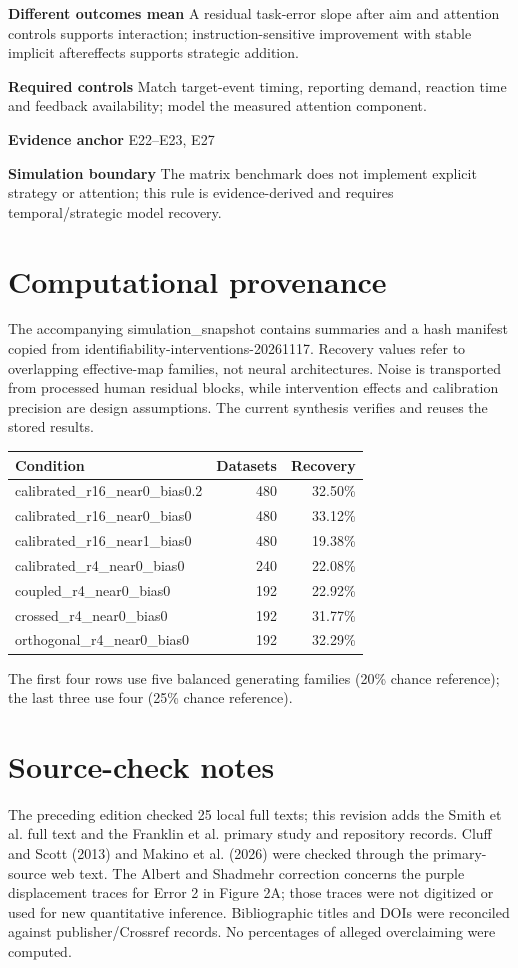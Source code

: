 \documentclass[11pt,a4paper]{article}
\begin{document}
\medskip\textbf{Different outcomes mean} A residual task-error slope after aim and attention controls supports interaction; instruction-sensitive improvement with stable implicit aftereffects supports strategic addition.\par
\medskip\textbf{Required controls} Match target-event timing, reporting demand, reaction time and feedback availability; model the measured attention component.\par
\medskip\textbf{Evidence anchor} E22--E23, E27\par
\medskip\textbf{Simulation boundary} The matrix benchmark does not implement explicit strategy or attention; this rule is evidence-derived and requires temporal/strategic model recovery.\par
\clearpage\section{Computational provenance}
The accompanying simulation\_snapshot contains summaries and a hash manifest copied from identifiability-interventions-20261117. Recovery values refer to overlapping effective-map families, not neural architectures. Noise is transported from processed human residual blocks, while intervention effects and calibration precision are design assumptions. The current synthesis verifies and reuses the stored results.
\begin{center}\small\begin{tabular}{lrr}\toprule
Condition & Datasets & Recovery\\\midrule
calibrated\_r16\_near0\_bias0.2 & 480 & 32.50\%\\
calibrated\_r16\_near0\_bias0 & 480 & 33.12\%\\
calibrated\_r16\_near1\_bias0 & 480 & 19.38\%\\
calibrated\_r4\_near0\_bias0 & 240 & 22.08\%\\
coupled\_r4\_near0\_bias0 & 192 & 22.92\%\\
crossed\_r4\_near0\_bias0 & 192 & 31.77\%\\
orthogonal\_r4\_near0\_bias0 & 192 & 32.29\%\\
\bottomrule\end{tabular}\end{center}
The first four rows use five balanced generating families (20\% chance reference); the last three use four (25\% chance reference).
\section{Source-check notes}
The preceding edition checked 25 local full texts; this revision adds the Smith et al. full text and the Franklin et al. primary study and repository records. Cluff and Scott (2013) and Makino et al. (2026) were checked through the primary-source web text. The Albert and Shadmehr correction concerns the purple displacement traces for Error 2 in Figure 2A; those traces were not digitized or used for new quantitative inference. Bibliographic titles and DOIs were reconciled against publisher/Crossref records. No percentages of alleged overclaiming were computed.
\end{document}
